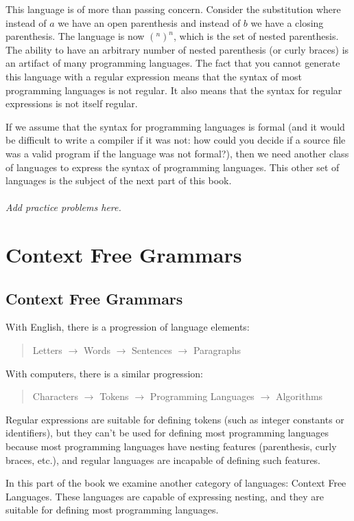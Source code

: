 \documentclass[letterpaper,12pt,openany,reqno]{book}%
\newcommand{\needsproblems}{\paragraph{Add practice problems here.}}
\begin{document}
This language is of more than passing concern. Consider the substitution where instead of $a$ we have an open parenthesis and instead of $b$ we have a closing parenthesis. The language is now $(^n )^n$, which is the set of nested parenthesis. The ability to have an arbitrary number of nested parenthesis (or curly braces) is an artifact of many programming languages. The fact that you cannot generate this language with a regular expression means that the syntax of most programming languages is not regular. It also means that the syntax for regular expressions is not itself regular.

If we assume that the syntax for programming languages is formal (and it would be difficult to write a compiler if it was not: how could you decide if a source file was a valid program if the language was not formal?), then we need another class of languages to express the syntax of programming languages. This other set of languages is the subject of the next part of this book.

\needsproblems

\part{Context Free Grammars}

\chapter{Context Free Grammars}
With English, there is a progression of language elements:
\begin{quote}
Letters $\rightarrow$ Words $\rightarrow$ Sentences $\rightarrow$ Paragraphs
\end{quote}
With computers, there is a similar progression:
\begin{quote}
Characters $\rightarrow$ Tokens $\rightarrow$ Programming Languages $\rightarrow$ Algorithms
\end{quote}

Regular expressions are suitable for defining tokens (such as integer constants or identifiers), but they can't be used for defining most programming languages because most programming languages have nesting features (parenthesis, curly braces, etc.), and regular languages are incapable of defining such features. 

In this part of the book we examine another category of languages: Context Free Languages. These languages are capable of expressing nesting, and they are suitable for defining most programming languages.
\end{document}
